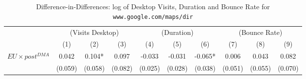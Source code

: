 \documentclass[11pt]{article}
\begin{document}
	
	\begin{table}
		\centering
		\def\sym#1{\ifmmode^{#1}\else\(^{#1}\)\fi}
		\caption{\label{tab:did_dir} Difference-in-Differences: log of Desktop Visits, Duration and Bounce Rate for \texttt{www.google.com/maps/dir}}
		\begin{threeparttable}
			\begin{adjustbox}{max width=\linewidth}
				\begin{tabular}{lccccccccc}
					\hline \noalign{\smallskip} 
					& \multicolumn{3}{c}{(Visits Desktop)} & \multicolumn{3}{c}{(Duration)} & \multicolumn{3}{c}{(Bounce Rate)} \\ \cmidrule(lr){2-4}\cmidrule(lr){5-7}\cmidrule(lr){8-10}
					
					&         (1)   &         (2)   &         (3)   &         (4)   &         (5)   &         (6)   &         (7)   &         (8)   &         (9)   \\
					\midrule
					$ EU \times post^{DMA} $ &       0.042   &       0.104*  &       0.097   &      -0.033   &      -0.031   &      -0.065*  &       0.006   &       0.043   &       0.082   \\
					&     (0.059)   &     (0.058)   &     (0.082)   &     (0.025)   &     (0.028)   &     (0.038)   &     (0.051)   &     (0.055)   &     (0.070)   \\
					

\end{tabular}
\end{adjustbox}
\end{threeparttable}
\end{table}
\end{document}
